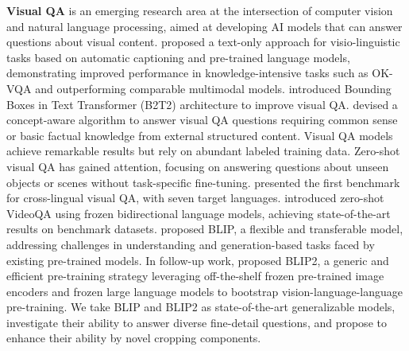\textbf{Visual QA}
is an emerging research area at the intersection of computer vision and natural language processing, aimed at developing AI models that can answer questions about visual content. \cite{salaberria2023image} proposed a text-only approach for visio-linguistic tasks based on automatic captioning and pre-trained language models, demonstrating improved performance in knowledge-intensive tasks such as OK-VQA and outperforming comparable multimodal models. \cite{alberti2019fusion} introduced Bounding Boxes in Text Transformer (B2T2) architecture to improve visual QA. \cite{garderes2020conceptbert} devised a concept-aware algorithm to answer visual QA questions requiring common sense or basic factual knowledge from external structured content. 
Visual QA models achieve remarkable results but rely on abundant labeled training data. Zero-shot visual QA has gained attention, focusing on answering questions about unseen objects or scenes without task-specific fine-tuning. \cite{pfeiffer2022xgqa} presented the first benchmark for cross-lingual visual QA, with seven target languages. 
\citet{yang2022zero} introduced zero-shot VideoQA using frozen bidirectional language models, achieving state-of-the-art results on benchmark datasets. 
\cite{blip} proposed BLIP, a flexible and transferable model, addressing challenges in understanding and generation-based tasks faced by existing pre-trained models. In follow-up work,
\cite{li2023blip} proposed BLIP2, a generic and efficient pre-training strategy leveraging off-the-shelf frozen pre-trained image encoders and frozen large language models to bootstrap vision-language-language pre-training. 
We take BLIP and BLIP2 as state-of-the-art generalizable models, investigate their ability to answer diverse fine-detail questions, and propose to enhance their ability by novel cropping components.

